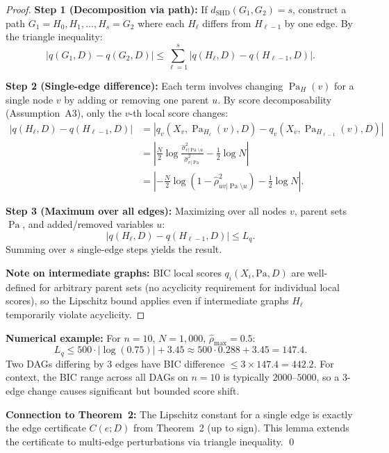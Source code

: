 \documentclass{article}
\theoremstyle{definition}
\theoremstyle{plain}
\theoremstyle{remark}
\DeclareMathOperator{\Pa}{Pa}
\DeclareMathOperator{\SHD}{SHD}
\begin{document}
\begin{proof}
\textbf{Step 1 (Decomposition via path):} If $d_{\SHD}(G_1, G_2) = s$, construct
a path $G_1 = H_0, H_1, \ldots, H_s = G_2$ where each $H_\ell$ differs from
$H_{\ell-1}$ by one edge. By the triangle inequality:
\begin{equation}
|q(G_1, D) - q(G_2, D)| \leq \sum_{\ell=1}^s |q(H_\ell, D) - q(H_{\ell-1}, D)|.
\end{equation}

\textbf{Step 2 (Single-edge difference):} Each term involves changing $\Pa_H(v)$
for a single node $v$ by adding or removing one parent $u$. By score decomposability
(Assumption~A3), only the $v$-th local score changes:
\begin{align}
|q(H_\ell, D) - q(H_{\ell-1}, D)|
&= |q_v(X_v, \Pa_{H_\ell}(v), D) - q_v(X_v, \Pa_{H_{\ell-1}}(v), D)| \\
&= \left|\frac{N}{2}\log\frac{\hat{\sigma}^2_{v|\Pa \setminus u}}
  {\hat{\sigma}^2_{v|\Pa}} - \frac{1}{2}\log N\right| \\
&= \left|-\frac{N}{2}\log(1 - \hat{\rho}_{uv|\Pa\setminus u}^2)
  - \frac{1}{2}\log N\right|.
\end{align}

\textbf{Step 3 (Maximum over all edges):} Maximizing over all nodes $v$, parent
sets $\Pa$, and added/removed variables $u$:
\begin{equation}
|q(H_\ell, D) - q(H_{\ell-1}, D)| \leq L_q.
\end{equation}
Summing over $s$ single-edge steps yields the result.

\textbf{Note on intermediate graphs:} BIC local scores $q_i(X_i, \text{Pa}, D)$ are
well-defined for arbitrary parent sets (no acyclicity requirement for individual
local scores), so the Lipschitz bound applies even if intermediate graphs $H_\ell$
temporarily violate acyclicity.
\end{proof}

\textbf{Numerical example:} For $n = 10$, $N = 1{,}000$, $\hat{\rho}_{\max} = 0.5$:
\begin{equation}
L_q \leq 500 \cdot |\log(0.75)| + 3.45 \approx 500 \cdot 0.288 + 3.45 = 147.4.
\end{equation}
Two DAGs differing by 3 edges have BIC difference $\leq 3 \times 147.4 = 442.2$.
For context, the BIC range across all DAGs on $n = 10$ is typically $2000$--$5000$,
so a 3-edge change causes significant but bounded score shift.

\textbf{Connection to Theorem~2:} The Lipschitz constant for a single edge is
exactly the edge certificate $C(e; D)$ from Theorem~2 (up to sign). This lemma
extends the certificate to multi-edge perturbations via triangle inequality. \qed
\end{document}
